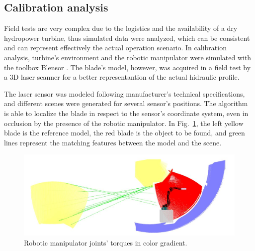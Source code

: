 

\subsection{Calibration analysis}

Field tests are very complex due to the logistics and the availability of a dry
hydropower turbine, thus simulated data were analyzed, which can be consistent
and can represent effectively the actual operation scenario. In calibration
analysis, turbine's environment and the robotic manipulator were simulated with
the toolbox Blensor \cite{Gschwandtner11b}. The blade's model, however, was
acquired in a field test by a 3D laser scanner for a better representantion of
the actual hidraulic profile.

The laser sensor was modeled following manufacturer's technical
specifications, and different scenes were generated for several sensor's
positions. The algorithm is able to localize the blade in respect to the
sensor's coordinate system, even in occlusion by the presence of the robotic
manipulator. In Fig.~\ref{fig:calibration}, the left yellow blade is the
reference model, the red blade is the object to be found, and green lines
represent the matching features between the model and the scene.

\begin{figure}
	\centering
	\includegraphics[width=.95\columnwidth]{figs/results/sim_mh12_sp}
    \caption{Robotic manipulator joints' torques in color gradient.}
    \label{fig:calibration}
\end{figure}